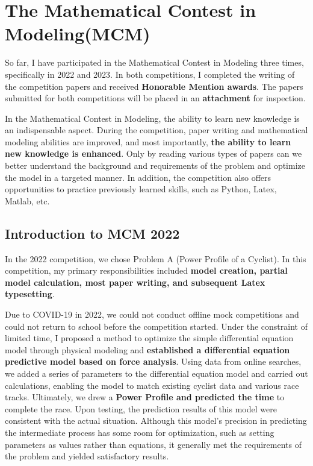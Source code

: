 \section{The Mathematical Contest in Modeling(MCM)}

So far, I have participated in the Mathematical Contest in Modeling three times, specifically in 2022 and 2023. In both competitions, I completed the writing of the competition papers and received \textbf{Honorable Mention awards}. The papers submitted for both competitions will be placed in an \textbf{attachment} for inspection.

In the Mathematical Contest in Modeling, the ability to learn new knowledge is an indispensable aspect. During the competition, paper writing and mathematical modeling abilities are improved, and most importantly, \textbf{the ability to learn new knowledge is enhanced}. Only by reading various types of papers can we better understand the background and requirements of the problem and optimize the model in a targeted manner. In addition, the competition also offers opportunities to practice previously learned skills, such as Python, Latex, Matlab, etc.

\subsection{Introduction to MCM 2022}
In the 2022 competition, we chose Problem A (Power Profile of a Cyclist). In this competition, my primary responsibilities included \textbf{model creation, partial model calculation, most paper writing, and subsequent Latex typesetting}.

Due to COVID-19 in 2022, we could not conduct offline mock competitions and could not return to school before the competition started. Under the constraint of limited time, I proposed a method to optimize the simple differential equation model through physical modeling and \textbf{established a differential equation predictive model based on force analysis}. Using data from online searches, we added a series of parameters to the differential equation model and carried out calculations, enabling the model to match existing cyclist data and various race tracks. Ultimately, we drew a \textbf{Power Profile and predicted the time} to complete the race. Upon testing, the prediction results of this model were consistent with the actual situation. Although this model's precision in predicting the intermediate process has some room for optimization, such as setting parameters as values rather than equations, it generally met the requirements of the problem and yielded satisfactory results.


